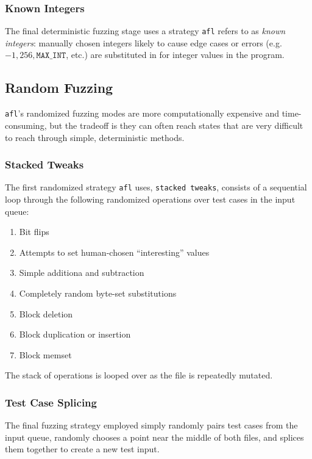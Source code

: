 \subsubsection{Known Integers}

The final deterministic fuzzing stage uses a strategy \texttt{afl} refers
to as \textit{known integers}: manually chosen integers likely to cause
edge cases or errors (e.g. $-1, 256, \texttt{MAX\_INT}$, etc.) are substituted
in for integer values in the program.

\subsection{Random Fuzzing}

\texttt{afl}'s randomized fuzzing modes are more computationally expensive
and time-consuming, but the tradeoff is they can often reach states that
are very difficult to reach through simple, deterministic methods.

\subsubsection{Stacked Tweaks}

The first randomized strategy \texttt{afl} uses, \texttt{stacked tweaks},
consists of a sequential loop through the following randomized operations
over test cases in the input queue:

\begin{enumerate}
	\item Bit flips
	\item Attempts to set human-chosen ``interesting'' values
    \item Simple additiona and subtraction
    \item Completely random byte-set substitutions
    \item Block deletion
    \item Block duplication or insertion
    \item Block memset
\end{enumerate}

The stack of operations is looped over as the file is repeatedly mutated.

\subsubsection{Test Case Splicing}

The final fuzzing strategy employed simply randomly pairs test cases from
the input queue, randomly chooses a point near the middle of both files,
and splices them together to create a new test input.

